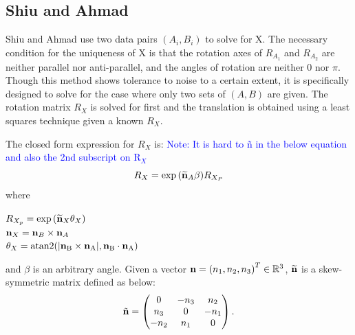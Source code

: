 \documentclass[twocolumn,10pt]{asme2ej}
\newcommand{\nn}{{\bf n}}
\begin{document}
\subsection{Shiu and Ahmad }
Shiu and Ahmad \cite{shiu1987finding,shiu1989calibration} use two data pairs $(A_{i}, B_{i})$ to solve for X. The necessary condition for the uniqueness of X is that the rotation axes of $R_{A_1}$ and $R_{A_2}$ are neither parallel nor anti-parallel, and the angles of rotation are neither 0 nor $\pi$. Though this method shows tolerance to noise to a certain extent, it is specifically designed to solve for the case where only two sets of $(A, B)$ are given. 
The rotation matrix $R_{X}$ is solved for first and the translation is obtained using a least squares technique given a known $R_{X}$.

The closed form expression for $R_{X}$ is:
\textcolor{blue}{Note: It is hard to \~n in the below equation and also the 2nd subscript on R$_X$}
\begin{equation}
R_{X} = \exp{(\widetilde{\nn}_{A}\beta)}R_{X_{P}}
\label{RotationCheng}
\end{equation}
where 
\begin{center}
$R_{X_{p}} =  \exp{(\widetilde{\nn}_{X}\theta_{X})}$\\
$\nn_{X} = \nn_{B} \times \nn_{A}$\\
$\theta_{X} = \rm atan2(|\nn_{B} \times \nn_{A}|,\nn_{B} \cdot \nn_{A})$\\
\end{center}
and $\beta$ is an arbitrary angle. Given a vector $\nn = \left( n_{1}, n_{2}, n_{3} \right)^{T} \in \mathbb{R}^{3}$, $\widetilde{\nn}$ is a skew-symmetric matrix defined as below:\\
\begin{equation}
\tilde{\nn}
=
\begin{pmatrix}
0 & -n_{3} & n_{2} \\
n_{3} & 0 & -n_{1} \\
-n_{2} & n_{1} & 0
\end{pmatrix}.
\end{equation}
\end{document}
